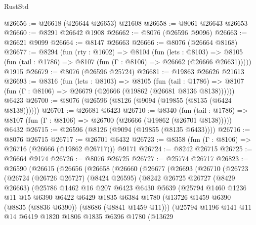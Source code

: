 \begin{lexlean}{RustStd}
\begin{coremodule}
@26656 := @26618 (@26644 @26653) @21608
@26658 := @8061 @26643 @26653
@26660 := @8291 @26642 @1908
@26662 := @8076 (@26596 @9096)
@26663 := @26621 @9099
@26664 := @8147 @26663
@26666 := @8076 (@26664 @8168)
@26677 := @8294
    (fun (rty : @1602) =>
    @8104
      (fun (lets : @8103) =>
      @8105 (fun (tail : @1786) => @8107 (fun (Γ : @8106) => @26662 (@26666 @26631)))))
    @1915
@26679 := @8076 (@26596 @25724)
@26681 := @19863 @26626 @21613
@26693 := @8316
    (fun (lets : @8103) =>
    @8105
      (fun (tail : @1786) =>
      @8107 (fun (Γ : @8106) => @26679 (@26666 (@19862 (@26681 @8136 @8138))))))
    @6423
@26700 := @8076 (@26596 (@8126 (@9094 (@19855 (@8135 (@6424 @8138))))))
@26701 := @26681 @6423
@26710 := @8340
    (fun (tail : @1786) => @8107 (fun (Γ : @8106) => @26700 (@26666 (@19862 (@26701 @8138)))))
    @6432
@26715 := @26596 (@8126 (@9094 (@19855 (@8135 @6433))))
@26716 := @8076 @26715
@26717 := @26701 @6432
@26723 := @8358 (fun (Γ : @8106) => @26716 (@26666 (@19862 @26717))) @9171
@26724 := @8242 @26715
@26725 := @26664 @9174
@26726 := @8076 @26725
@26727 := @25774 @26717
@26823 := @26590
    (@26615
      (@26656
        (@26658
          (@26660
            (@26677
              (@26693
                (@26710
                  (@26723
                    (@26724
                      (@26726 @26727)
                      (@8424 @26595)
                      (@8242
                        @26725
                        @26727
                        (@8429 @26663)
                        (@25786
                          @1462
                          @16
                          @207
                          @6423
                          @6430
                          @5639
                          (@25794
                            @1460
                            @1236
                            @11
                            @15
                            @6390
                            @6422
                            @6429
                            @1835
                            @6384
                            @1780
                            (@13726 @1459 @6390 (@8835 (@8836 @6390)) (@8686 (@8841 @1459 @11)))
                            (@25794
                              @1196
                              @141
                              @11
                              @14
                              @6419
                              @1820
                              @1806
                              @1835
                              @6396
                              @1780
                              (@13629

\end{coremodule}
\end{lexlean}
